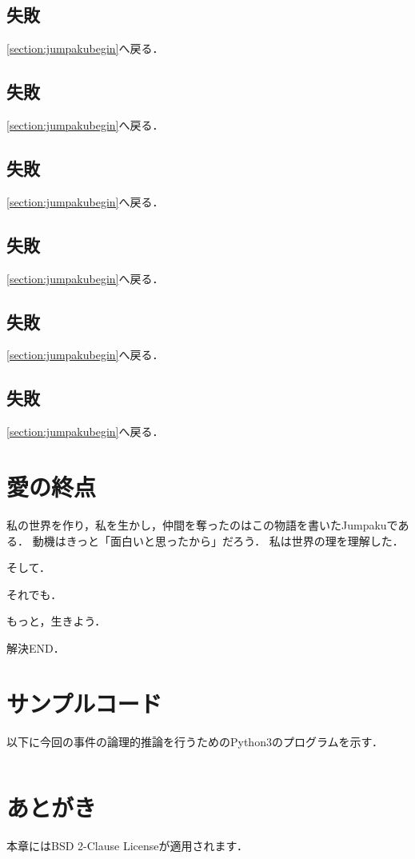\subsection{失敗}\label{subsection:jumpakulast3failureU}\ref{section:jumpakubegin}へ戻る．\newpage
\subsection{失敗}\label{subsection:jumpakulast3failureV}\ref{section:jumpakubegin}へ戻る．\newpage
\subsection{失敗}\label{subsection:jumpakulast3failureW}\ref{section:jumpakubegin}へ戻る．\newpage
\subsection{失敗}\label{subsection:jumpakulast3failureX}\ref{section:jumpakubegin}へ戻る．\newpage
\subsection{失敗}\label{subsection:jumpakulast3failureY}\ref{section:jumpakubegin}へ戻る．\newpage
\subsection{失敗}\label{subsection:jumpakulast3failureZ}\ref{section:jumpakubegin}へ戻る．\newpage

\section{愛の終点}\label{section:jumpakuending}
私の世界を作り，私を生かし，仲間を奪ったのはこの物語を書いたJumpakuである．
動機はきっと「面白いと思ったから」だろう．
私は世界の理を理解した．

そして．

それでも．

もっと，生きよう．

解決END．
\newpage

\section*{サンプルコード}\label{section:jumpakuprogram}
以下に今回の事件の論理的推論を行うためのPython3のプログラムを示す．
\inputminted[linenos]{python3}{./jumpakuasset/LogicQuiz.py}

\section*{あとがき}
本章にはBSD 2-Clause Licenseが適用されます．

